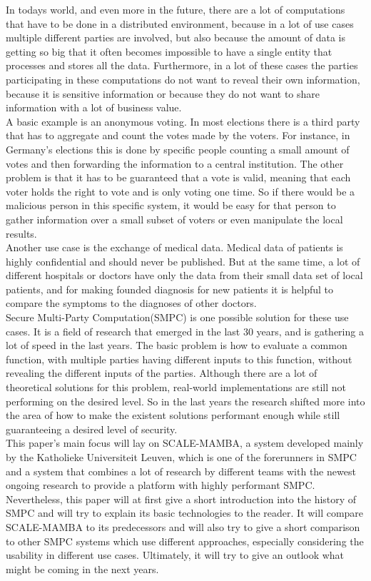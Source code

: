 \documentclass[english,runningheads,a4paper]{llncs}[2018/03/10]
\begin{document}
In todays world, and even more in the future, there are a lot of computations that have to be done in a distributed environment, because in a lot of use cases multiple different parties are involved, but also because the amount of data is getting so big that it often becomes impossible to have a single entity that processes and stores all the data. Furthermore, in a lot of these cases the parties participating in these computations do not want to reveal their own information, because it is sensitive information or because they do not want to share information with a lot of business value.\\
A basic example is an anonymous voting. In most elections there is a third party that has to aggregate and count the votes made by the voters. For instance, in Germany's elections this is done by specific people counting a small amount of votes and then forwarding the information to a central institution. The other problem is that it has to be guaranteed that a vote is valid, meaning that each voter holds the right to vote and is only voting one time. So if there would be a malicious person in this specific system, it would be easy for that person to gather information over a small subset of voters or even manipulate the local results.\\
Another use case is the exchange of medical data. Medical data of patients is highly confidential and should never be published. But at the same time, a lot of different hospitals or doctors have only the data from their small data set of local patients, and for making founded diagnosis for new patients it is helpful to compare the symptoms to the diagnoses of other doctors.\\
Secure Multi-Party Computation(SMPC) is one possible solution for these use cases. It is a field of research that emerged in the last 30 years, and is gathering a lot of speed in the last years. 
The basic problem is how to evaluate a common function, with multiple parties having different inputs to this function, without revealing the different inputs of the parties. Although there are a lot of theoretical solutions for this problem, real-world implementations are still not performing on the desired level. So in the last years the research shifted more into the area of how to make the existent solutions performant enough while still guaranteeing a desired level of security.\\
This paper's main focus will lay on SCALE-MAMBA, a system developed mainly by the Katholieke Universiteit Leuven, which is one of the forerunners in SMPC and a system that combines a lot of research by different teams with the newest ongoing research to provide a platform with highly performant SMPC. Nevertheless, this paper will at first give a short introduction into the history of SMPC and will try to explain its basic technologies to the reader. It will compare SCALE-MAMBA to its predecessors and will also try to give a short comparison to other SMPC systems which use different approaches, especially considering the usability in different use cases. Ultimately, it will try to give an outlook what might be coming in the next years.\\
\end{document}
